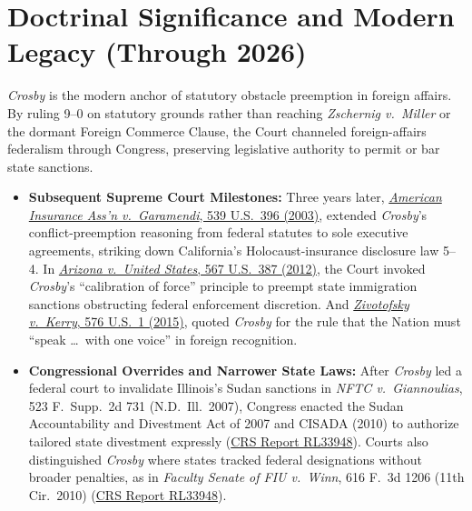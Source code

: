 \documentclass[12pt]{article}
\begin{document}
\section{Doctrinal Significance and Modern Legacy (Through 2026)}

\textit{Crosby} is the modern anchor of statutory obstacle preemption in foreign affairs. By ruling 9--0 on statutory grounds rather than reaching \textit{Zschernig v.\ Miller} or the dormant Foreign Commerce Clause, the Court channeled foreign-affairs federalism through Congress, preserving legislative authority to permit or bar state sanctions.

\begin{itemize}
    \item \textbf{Subsequent Supreme Court Milestones:} Three years later, \href{https://supreme.justia.com/cases/federal/us/539/396/}{\textit{American Insurance Ass'n v.\ Garamendi}, 539 U.S.\ 396 (2003)}, extended \textit{Crosby}'s conflict-preemption reasoning from federal statutes to sole executive agreements, striking down California's Holocaust-insurance disclosure law 5--4. In \href{https://www.everycrsreport.com/reports/R42719.html}{\textit{Arizona v.\ United States}, 567 U.S.\ 387 (2012)}, the Court invoked \textit{Crosby}'s ``calibration of force'' principle to preempt state immigration sanctions obstructing federal enforcement discretion. And \href{https://supreme.justia.com/cases/federal/us/576/1/}{\textit{Zivotofsky v.\ Kerry}, 576 U.S.\ 1 (2015)}, quoted \textit{Crosby} for the rule that the Nation must ``speak \dots\ with one voice'' in foreign recognition.
    \item \textbf{Congressional Overrides and Narrower State Laws:} After \textit{Crosby} led a federal court to invalidate Illinois's Sudan sanctions in \textit{NFTC v.\ Giannoulias}, 523 F.\ Supp.\ 2d 731 (N.D.\ Ill.\ 2007), Congress enacted the Sudan Accountability and Divestment Act of 2007 and CISADA (2010) to authorize tailored state divestment expressly (\href{https://www.everycrsreport.com/reports/RL33948.html}{CRS Report RL33948}). Courts also distinguished \textit{Crosby} where states tracked federal designations without broader penalties, as in \textit{Faculty Senate of FIU v.\ Winn}, 616 F.\ 3d 1206 (11th Cir.\ 2010) (\href{https://www.everycrsreport.com/reports/RL33948.html}{CRS Report RL33948}).

\end{itemize}
\end{document}
